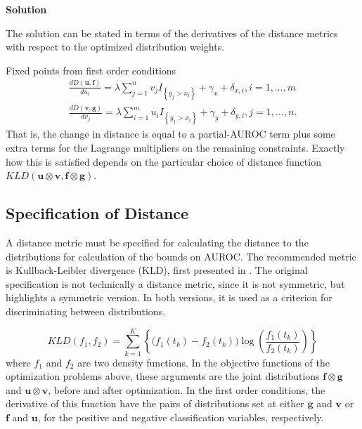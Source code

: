 \textbf{Solution}

The solution can be stated in terms of the derivatives of the distance metrics with respect to the optimized distribution weights.

Fixed points from first order conditions
\begin{align}
    \frac{d D(\mathbf{u},\mathbf{f})}{d u_i} = \lambda \sum_{j = 1}^{n} v_j I_{\left\{ y_j > x_i \right\}} + \gamma_x + \delta_{x,i},
    i = 1, \dots, m \\
    \frac{d D(\mathbf{v},\mathbf{g})}{d v_j} = \lambda \sum_{i = 1}^{m} u_i I_{\left\{ y_j > x_i \right\}} + \gamma_y + \delta_{y,i},
    j = 1, \dots, n.
\end{align}
%
That is, the change in distance is equal to a partial-AUROC term plus some extra terms for the Lagrange multipliers on the remaining constraints. Exactly how this is satisfied depends on the particular choice of distance function $KLD(\mathbf{u} \otimes \mathbf{v}, \mathbf{f} \otimes \mathbf{g})$.





\subsection{Specification of Distance}


A distance metric must be specified for calculating the distance to the distributions for calculation of the bounds on AUROC.
%
%
The recommended metric is Kullback-Leibler divergence (KLD), first presented in \citet{kullbackliebler1951}.
%
The original specification is not technically a distance metric, since it is not symmetric, but \citet{bigi2003chapter} highlights a symmetric version.
%
In both versions, it is used as a criterion for discriminating between distributions.

\begin{equation}
    KLD(f_1, f_2) = \sum_{k = 1}^{K} \left\{ \bigg( f_1(t_k) - f_2(t_k) \bigg)
        \log \left( \frac{f_1(t_k)}{f_2(t_k)} \right) \right\}
\end{equation}
%
\noindent where $f_1$ and $f_2$ are two density functions.
In the objective functions of the optimization problems above, these arguments are the joint distributions
$\mathbf{f} \otimes \mathbf{g}$ and $\mathbf{u} \otimes \mathbf{v}$, before and after optimization.
In the first order conditions, the derivative of this function have the pairs of distributions set at either
$\mathbf{g}$ and $\mathbf{v}$ or $\mathbf{f}$ and $\mathbf{u}$,
for the positive and negative classification variables, respectively.

